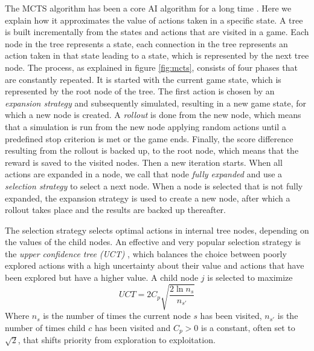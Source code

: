\label{subsec:mcts}
The MCTS algorithm has been a core AI algorithm for a long time
\cite{browne2012survey}. Here we explain how it approximates the value
of actions taken in a specific state. A tree is built incrementally from
the states and actions that are visited in a game. Each node in the tree
represents a state, each connection in the tree represents an action taken in
that state leading to a state, which is represented by the next tree node. 
The process, as explained in figure \ref{fig:mcts}, consists of four phases that
are constantly repeated. It is started with the current game state, which is
represented by the root node of the tree. The first action is chosen by an
\emph{expansion strategy} and subsequently simulated, resulting in a new game
state, for which a new node is created. A \emph{rollout} is done from the new
node, which means that a simulation is run from the new node applying random
actions until a predefined stop criterion is met or the game ends. Finally, the
score difference resulting from the rollout is backed up, to the root node,
which means that the reward is saved to the visited nodes. Then a new iteration
starts. When all actions are expanded in a node, we call that node \emph{fully
expanded} and use a \emph{selection strategy} to select a next node. When a node
is selected that is not fully expanded, the expansion strategy is used to create
a new node, after which a rollout takes place and the results are backed up
thereafter.

The selection strategy selects optimal actions in internal tree nodes, depending
on the values of the child nodes. An effective and very popular selection
strategy is the \emph{upper confidence tree (UCT)} \cite{kocsis2006bandit},
which balances the choice between poorly explored actions with a high
uncertainty about their value and actions that have been explored but have a
higher value. A child node $j$ is selected to maximize
\begin{equation}
	\label{eq:uct}
	UCT = 2C_p \sqrt{\frac{2 \ln n_s}{n_{s'}}}
\end{equation}
Where $n_s$ is the number of times the current node $s$ has been visited,
$n_{s'}$ is the number of times child $c$ has been visited and $C_p > 0$ is a
constant, often set to $\sqrt{2}$, that shifts priority from exploration to
exploitation.

